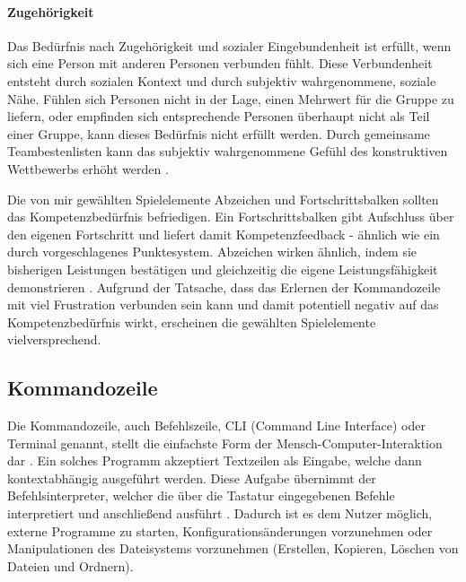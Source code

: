 \paragraph{Zugehörigkeit}
Das Bedürfnis nach Zugehörigkeit und sozialer Eingebundenheit ist erfüllt, wenn sich eine Person mit anderen Personen verbunden fühlt. Diese Verbundenheit entsteht durch sozialen Kontext und durch subjektiv wahrgenommene, soziale Nähe. Fühlen sich Personen nicht in der Lage, einen Mehrwert für die Gruppe zu liefern, oder empfinden sich entsprechende Personen überhaupt nicht als Teil einer Gruppe, kann dieses Bedürfnis nicht erfüllt werden. Durch gemeinsame Teambestenlisten kann das subjektiv wahrgenommene Gefühl des konstruktiven Wettbewerbs erhöht werden \cite{sailer2016wirkung}.


Die von mir gewählten Spielelemente Abzeichen und Fortschrittsbalken sollten das Kompetenzbedürfnis befriedigen. Ein Fortschrittsbalken gibt Aufschluss über den eigenen Fortschritt und liefert damit Kompetenzfeedback - ähnlich wie ein durch  vorgeschlagenes Punktesystem. Abzeichen wirken ähnlich, indem sie bisherigen Leistungen bestätigen und gleichzeitig die eigene Leistungsfähigkeit demonstrieren \cite{antin_badges_2011}. Aufgrund der Tatsache, dass das Erlernen der Kommandozeile mit viel Frustration verbunden sein kann und damit potentiell negativ auf das Kompetenzbedürfnis wirkt, erscheinen die gewählten Spielelemente vielversprechend.

\subsection{Kommandozeile}
Die Kommandozeile, auch Befehlszeile, CLI (Command Line Interface) oder Terminal genannt, stellt die einfachste Form der Mensch-Computer-Interaktion dar \cite{Kumar2005}. Ein solches Programm akzeptiert Textzeilen als Eingabe, welche dann kontextabhängig ausgeführt werden. Diese Aufgabe übernimmt der Befehlsinterpreter, welcher die über die Tastatur eingegebenen Befehle interpretiert und anschließend ausführt \cite{wissen_interpreter}. 
Dadurch ist es dem Nutzer möglich, externe Programme zu starten, Konfigurationsänderungen vorzunehmen oder Manipulationen des Dateisystems vorzunehmen (Erstellen, Kopieren, Löschen von Dateien und Ordnern).

